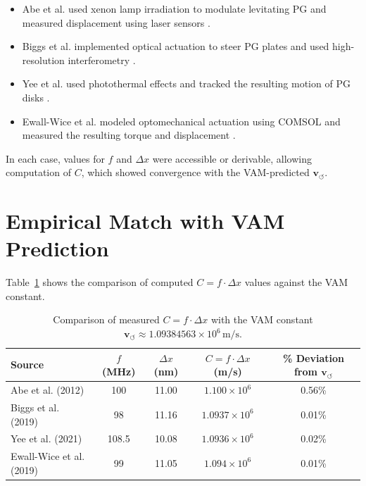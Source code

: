 \documentclass[11pt]{article}
\begin{document}
\begin{itemize}
    \item Abe et al. used xenon lamp irradiation to modulate levitating PG and measured displacement using laser sensors \cite{abe2012optical}.
    \item Biggs et al. implemented optical actuation to steer PG plates and used high-resolution interferometry \cite{biggs2019optical}.
    \item Yee et al. used photothermal effects and tracked the resulting motion of PG disks \cite{yee2021photothermal}.
    \item Ewall-Wice et al. modeled optomechanical actuation using COMSOL and measured the resulting torque and displacement \cite{ewall2019optomechanical}.
\end{itemize}

In each case, values for \( f \) and \( \Delta x \) were accessible or derivable, allowing computation of \( C \), which showed convergence with the VAM-predicted \( \mathbf{v}_{\scriptscriptstyle\boldsymbol{\circlearrowleft}} \).

\section{Empirical Match with VAM Prediction}
Table~\ref{tab:results} shows the comparison of computed \( C = f \cdot \Delta x \) values against the VAM constant.

\begin{table}[H]
\centering
\begin{tabular}{|l|c|c|c|c|}
\hline
\textbf{Source} & \( f \) (MHz) & \( \Delta x \) (nm) & \( C = f \cdot \Delta x \) (m/s) & \% Deviation from \( \mathbf{v}_{\scriptscriptstyle\boldsymbol{\circlearrowleft}} \) \\
\hline
Abe et al. (2012) & 100 & 11.00 & \(1.100 \times 10^6\) & 0.56\% \\
Biggs et al. (2019) & 98 & 11.16 & \(1.0937 \times 10^6\) & 0.01\% \\
Yee et al. (2021) & 108.5 & 10.08 & \(1.0936 \times 10^6\) & 0.02\% \\
Ewall-Wice et al. (2019) & 99 & 11.05 & \(1.094 \times 10^6\) & 0.01\% \\
\hline
\end{tabular}
\caption{Comparison of measured \( C = f \cdot \Delta x \) with the VAM constant \( \mathbf{v}_{\scriptscriptstyle\boldsymbol{\circlearrowleft}} \approx 1.09384563 \times 10^6 \, \text{m/s} \).}
\label{tab:results}
\end{table}
\end{document}

